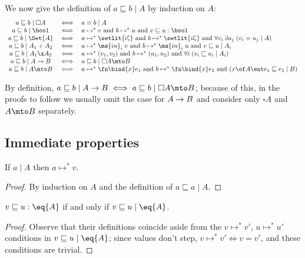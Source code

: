 \documentclass{article}
\renewcommand{\land}{~\text{and}~}
\newcommand{\ale}{\sqsubseteq}
\newcommand{\aeq}{\equiv}
\newcommand{\step}{\mapsto}
\newcommand{\steps}{\step^*}
\newcommand{\disc}[1]{\square{#1}}
\newcommand{\lr}[2]{#2\mathrel{|}#1}
\newcommand{\lrcx}[3]{#1 \ent \lr{#2}{#3}}
\begin{document}
We now give the definition of $\lr{A}{a \ale b}$ by induction on $A$:
\[\begin{array}{ccl}
  \lr{\disc{A}}{a \ale b} &\iff& \lr{A}{a \aeq b}\\
  \lr{\bool}{a \ale b} &\iff&
  a \steps v \land b \steps u \land v \ale u : \bool\\
  \lr{\Set{A}}{a \ale b} &\iff&
  a \steps \setlit{\vec{v_i}} \land b \steps \setlit{\vec{u_i}}
  \land \forall v_i\,\exists u_j\; (\lr{A}{v_i \aeq u_j})\\
  \lr{A_1 + A_2}{a \ale b} &\iff&
  a \steps \ms{in}_i\;v \land b \steps \ms{in}_i\;u \land \lr{A_i}{v \ale u}\\
  \lr{A_1 \x A_2}{a \ale b} &\iff&
  a \steps (v_1, v_2) \land b \steps (u_1, u_2)
  \land \forall i\; (\lr{A_i}{v_i \ale u_i})\\
  \lr{A \to B}{a \ale b} &\iff& \lr{\disc{A} \mto B}{a \ale b}\\
  \lr{A \mto B}{a \ale b} &\iff&
  a \steps \fn\bind{x} e_1 \land b \steps \fn\bind{x} e_2
  \land (\lrcx{x\of A}{B}{e_1 \ale e_2})
\end{array}\]

By definition, $\lr{A \uto B}{a \ale b} \iff \lr{\disc{A} \mto B}{a \ale b}$;
because of this, in the proofs to follow we usually omit the case for $A \to B$
and consider only $\disc{A}$ and $A \mto B$ separately.


\subsection{Immediate properties}

\begin{theorem}[Termination]\label{thm:termination}
  If $\lr{A}{a}$ then $a \steps v$.
\end{theorem}

\begin{proof}
  By induction on $A$ and the definition of $\lr{A}{a \ale a}$.
\end{proof}

\begin{theorem}
  \label{thm:agree-ineq}
  $v \ale u : \eq{A}$ if and only if $\lr{\eq{A}}{v \ale u}$.
\end{theorem}

\begin{proof}
  Observe that their definitions coincide aside from the $v \steps v'$, $u
  \steps u'$ conditions in $\lr{\eq{A}}{v \ale u}$; since values don't step, $v
  \steps v' \iff v = v'$, and these conditions are trivial.
\end{proof}
\end{document}
